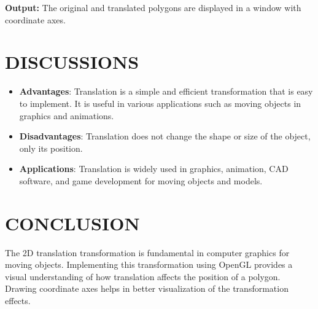 \documentclass{article}
\begin{document}
\textbf{Output:}
The original and translated polygons are displayed in a window with coordinate axes.

\section*{DISCUSSIONS}
\begin{itemize}
    \item \textbf{Advantages}: Translation is a simple and efficient transformation that is easy to implement. It is useful in various applications such as moving objects in graphics and animations.
    \item \textbf{Disadvantages}: Translation does not change the shape or size of the object, only its position.
    \item \textbf{Applications}: Translation is widely used in graphics, animation, CAD software, and game development for moving objects and models.
\end{itemize}

\section*{CONCLUSION}
The 2D translation transformation is fundamental in computer graphics for moving objects. Implementing this transformation using OpenGL provides a visual understanding of how translation affects the position of a polygon. Drawing coordinate axes helps in better visualization of the transformation effects.
\end{document}

